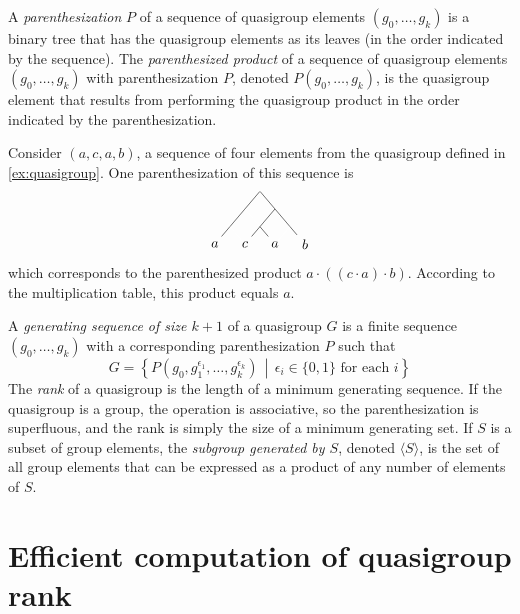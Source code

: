 \documentclass{article}
\begin{document}
A \emph{parenthesization} $P$ of a sequence of quasigroup elements $(g_0, \dotsc, g_k)$ is a binary tree that has the quasigroup elements as its leaves (in the order indicated by the sequence).
The \emph{parenthesized product} of a sequence of quasigroup elements $(g_0, \dotsc, g_k)$ with parenthesization $P$, denoted $P(g_0, \dotsc, g_k)$, is the quasigroup element that results from performing the quasigroup product in the order indicated by the parenthesization.

\begin{example}
  Consider $(a, c, a, b)$, a sequence of four elements from the quasigroup defined in \autoref{ex:quasigroup}.
  One parenthesization of this sequence is
  \begin{equation*}
    \begin{tikzpicture}[xscale=0.5, yscale=0.3]
      \node[minimum size=0pt, inner sep=0pt] {}
      child {
        child {
          child {node {$a$}}
          child[color=white] {}
        }
        child[color=white] {}
      }
      child {
        child {
          child {node {$c$}}
          child {node {$a$}}
        }
        child {
          child[color=white] {}
          child {node {$b$}}
        }
      };
    \end{tikzpicture}
  \end{equation*}
  which corresponds to the parenthesized product $a \cdot ((c \cdot a) \cdot b)$.
  According to the multiplication table, this product equals $a$.
\end{example}

A \emph{generating sequence of size $k + 1$} of a quasigroup $G$ is a finite sequence $(g_0, \dotsc, g_k)$ with a corresponding parenthesization $P$ such that
$$
G = \left\{P(g_0, g_1^{\epsilon_1}, \dotsc, g_k^{\epsilon_k}) \, \middle| \, \epsilon_i \in \{0, 1\} \text{ for each } i \right\}
$$
The \emph{rank} of a quasigroup is the length of a minimum generating sequence.
If the quasigroup is a group, the operation is associative, so the parenthesization is superfluous, and the rank is simply the size of a minimum generating set.
If $S$ is a subset of group elements, the \emph{subgroup generated by $S$}, denoted $\langle S \rangle$, is the set of all group elements that can be expressed as a product of any number of elements of $S$.

\section{Efficient computation of quasigroup rank}
\end{document}
